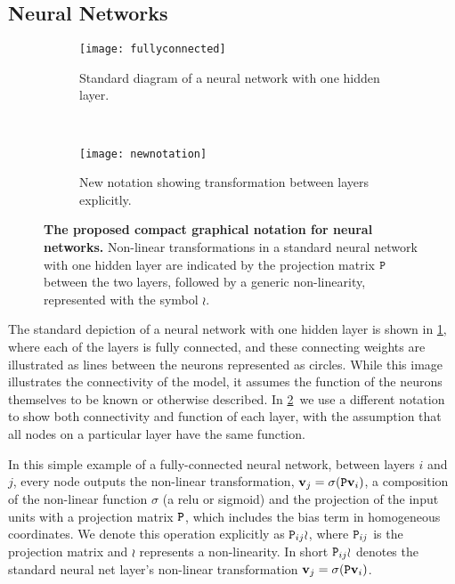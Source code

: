 \documentclass[thesis]{subfiles}
\begin{document}
	\subsection{Neural Networks}
	\begin{figure}[tbp] 
		\centering
		\begin{subfigure}[b]{0.45\textwidth}
			\centering
			\texttt{[image: fullyconnected]}
			\caption{Standard diagram of a neural network with one hidden layer.}\label{fig:oldnotation}
		\end{subfigure}
		~
		\begin{subfigure}[b]{0.45\textwidth}
			\centering
			\texttt{[image: newnotation]}
			\caption{New notation showing transformation between layers explicitly.}\label{fig:newnotation}
		\end{subfigure}
		\caption[New graphical notation for neural networks.]{\textbf{The proposed compact graphical notation for neural networks.} Non-linear transformations in a standard neural network with one hidden layer are indicated by the projection matrix $\mat P$ between the two layers, followed by a generic non-linearity, represented with the symbol $\wr$.}\label{fig:newGraphLanguage}
	\end{figure}
	
	The standard depiction of a neural network with one hidden layer is shown in \cref{fig:oldnotation}, where each of the layers is fully connected, and these connecting weights are illustrated as lines between the neurons represented as circles. While this image illustrates the connectivity of the model, it assumes the function of the neurons themselves to be known or otherwise described. In \cref{fig:newnotation}\ we use a different notation to show both connectivity and function of each layer, with the assumption that all nodes on a particular layer have the same function.
	
	In this simple example of a fully-connected neural network, between layers $i$ and $j$, every node outputs the non-linear transformation, $\vec v_j = \sigma(\mat P \vec v_i)$, a composition of the non-linear function $\sigma$ (\eg a \gls{relu} or sigmoid) and the projection of the input units with a projection matrix $\mat P$, which includes the bias term in homogeneous coordinates. We denote this operation explicitly as $\mat P_{ij} \wr$, where $\mat P_{ij}$ is the projection matrix and $\wr$ represents a non-linearity. In short $\mat P_{ij} \wr$ denotes the standard neural net layer's non-linear transformation $\vec v_j = \sigma(\mat P \vec v_i)$. 
	
\end{document}
